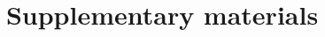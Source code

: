 \documentclass{article}
\title{Supplementary materials}
\author{}
\date{}
\begin{document}
\maketitle

\begin{refsection}

\end{refsection}

\clearpage

\begin{refsection}

\end{refsection}

\clearpage

% 



\end{document}
